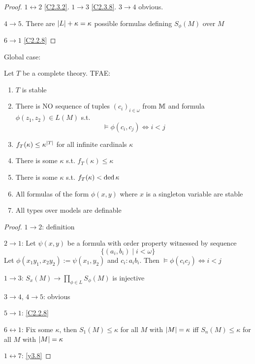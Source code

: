 \documentclass[11pt]{article}
\begin{document}
\begin{proof}
\(1\leftrightarrow 2\) \ref{C2.3.2}. \(1\to 3\) \ref{C2.3.8}. \(3\to 4\) obvious.

\(4\to 5\). There are \(\abs{L}+\kappa=\kappa\) possible formulas defining \(S_\phi(M)\) over \(M\)

\(6\to 1\) \ref{C2.2.8}
\end{proof}

Global case:
\begin{theorem}[]
\label{y3.9}
Let \(T\) be a complete theory. TFAE:
\begin{enumerate}
\item \(T\) is stable
\item There is NO sequence of tuples \((c_i)_{i\in\omega}\) from \(\mathbb{M}\) and formula \(\phi(z_1,z_2)\in L(M)\) s.t.
\begin{equation*}
\vDash\phi(c_i,c_j)\Leftrightarrow i<j
\end{equation*}
\item \(f_T(\kappa)\le\kappa^{\abs{T}}\) for all infinite cardinals \(\kappa\)
\item There is some \(\kappa\) s.t. \(f_T(\kappa)\le\kappa\)
\item There is some \(\kappa\) s.t. \(f_T(\kappa)<\operatorname{ded}\kappa\)
\item All formulas of the form \(\phi(x,y)\) where \(x\) is a singleton variable are stable
\item All types over models are definable
\end{enumerate}
\end{theorem}

\begin{proof}
\(1\to 2\): definition

\(2\to 1\): Let \(\psi(x,y)\) be a formula with order property witnessed by sequence
\begin{equation*}
\{(a_i,b_i)\mid i<\omega\}
\end{equation*}
Let \(\phi(x_1y_1,x_2y_2):=\psi(x_1,y_2)\) and \(c_i:a_ib_i\). Then \(\vDash\phi(c_ic_j)\Leftrightarrow i<j\)

\(1\to 3\): \(S_x(M)\to\prod_{\phi\in L}S_\phi(M)\) is injective

\(3\to 4\), \(4\to 5\): obvious

\(5\to 1\): \ref{C2.2.8}

\(6\leftrightarrow 1\): Fix some \(\kappa\), then \(S_1(M)\le\kappa\) for all \(M\) with \(\abs{M}=\kappa\) iff \(S_n(M)\le\kappa\) for all \(M\)
with \(\abs{M}=\kappa\)

\(1\leftrightarrow 7\): \ref{y3.8}
\end{proof}
\end{document}
